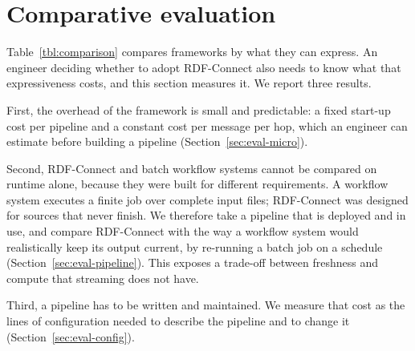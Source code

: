 %
%
%

\newcommand{\res}[1]{\textbf{[#1]}}

\section{Comparative evaluation}
\label{sec:evaluation}

Table~\ref{tbl:comparison} compares frameworks by what they can express. An
engineer deciding whether to adopt RDF-Connect also needs to know what that
expressiveness costs, and this section measures it. We report three results.

First, the overhead of the framework is small and predictable: a fixed start-up
cost per pipeline and a constant cost per message per hop, which an engineer can
estimate before building a pipeline (Section~\ref{sec:eval-micro}).

Second, RDF-Connect and batch workflow systems cannot be compared on runtime
alone, because they were built for different requirements. A workflow system
executes a finite job over complete input files; RDF-Connect was designed for
sources that never finish. We therefore take a pipeline that is deployed and in
use, and compare RDF-Connect with the way a workflow system would realistically
keep its output current, by re-running a batch job on a schedule
(Section~\ref{sec:eval-pipeline}). This exposes a trade-off between freshness
and compute that streaming does not have.

Third, a pipeline has to be written and maintained. We measure that cost as the
lines of configuration needed to describe the pipeline and to change it
(Section~\ref{sec:eval-config}).

